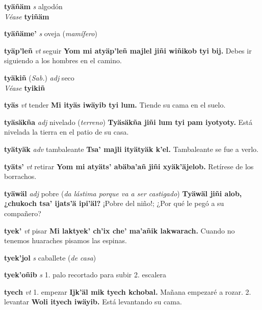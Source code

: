 \documentclass[10pt]{scrbook}
\newcommand{\entry}[1]{\textbf{#1}}
\newcommand{\onedefinition}[1]{#1.}
\newcommand{\partofspeech}[1]{\textit{#1}}
\newcommand{\spanishtranslation}[1]{#1}
\newcommand{\clarification}[1]{(\textit{#1})}
\newcommand{\cholexample}[1]{\textbf{#1}}
\newcommand{\exampletranslation}[1]{#1}
\newcommand{\alsosee}[1]{\\\textit{Véase} \textbf{#1}}
\newcommand{\relevantdialect}[1]{(\textit{#1})}
\begin{document}
\begin{multicols}{2}
\entry{tyäñäm}
\partofspeech{s}
\spanishtranslation{algodón}
\alsosee{tyiñäm}

\entry{tyäñäme'}
\partofspeech{s}
\spanishtranslation{oveja}
\clarification{mamífero}

\entry{tyäp'leñ}
\partofspeech{vt}
\spanishtranslation{seguir}
\cholexample{Yom mi atyäp'leñ majlel jiñi wiñikob tyi bij.}
\exampletranslation{Debes ir siguiendo a los hombres en el camino.}

\entry{tyäkiñ}
\relevantdialect{Sab.}
\partofspeech{adj}
\spanishtranslation{seco}
\alsosee{tyikiñ}

\entry{tyäs}
\partofspeech{vt}
\spanishtranslation{tender}
\cholexample{Mi ityäs iwäyib tyi lum.}
\exampletranslation{Tiende su cama en el suelo.}

\entry{tyäsäkña}
\partofspeech{adj}
\spanishtranslation{nivelado}
\clarification{terreno}
\cholexample{Tyäsäkña jiñi lum tyi pam iyotyoty.}
\exampletranslation{Está nivelada la tierra en el patio de su casa.}

\entry{tyätyäk}
\partofspeech{adv}
\spanishtranslation{tambaleante}
\cholexample{Tsa' majli ityätyäk k'el.}
\exampletranslation{Tambaleante se fue a verlo.}

\entry{tyäts'}
\partofspeech{vt}
\spanishtranslation{retirar}
\cholexample{Yom mi atyäts' abäba'añ jiñi xyäk'äjelob.}
\exampletranslation{Retírese de los borrachos.}

\entry{tyäwäl}
\partofspeech{adj}
\spanishtranslation{pobre}
\clarification{da lástima porque va a ser castigado}
\cholexample{Tyäwäl jiñi alob, ¿chukoch tsa' ijats'ä ipi'äl?}
\exampletranslation{¡Pobre del niño!; ¿Por qué le pegó a su compañero?}

\entry{tyek'}
\partofspeech{vt}
\spanishtranslation{pisar}
\cholexample{Mi laktyek' ch'ix che' ma'añik lakwarach.}
\exampletranslation{Cuando no tenemos huaraches pisamos las espinas.}

\entry{tyek'jol}
\partofspeech{s}
\spanishtranslation{caballete}
\clarification{de casa}

\entry{tyek'oñib}
\partofspeech{s}
\onedefinition{1}
\spanishtranslation{palo recortado para subir}
\onedefinition{2}
\spanishtranslation{escalera}

\entry{tyech}
\partofspeech{vt}
\onedefinition{1}
\spanishtranslation{empezar}
\cholexample{Ijk'äl mik tyech kchobal.}
\exampletranslation{Mañana empezaré a rozar.}
\onedefinition{2}
\spanishtranslation{levantar}
\cholexample{Woli ityech iwäyib.}
\exampletranslation{Está levantando su cama.}


\end{multicols}
\end{document}
